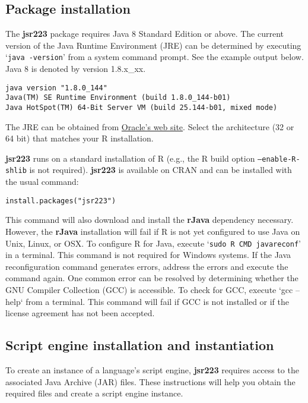 \documentclass[
article,
11pt, %
a4paper, %
oneside, %
headinclude,footinclude, %
]{scrartcl}
\theoremstyle{definition} %
\theoremstyle{plain} %
\theoremstyle{remark} %
\newcommand{\pkg}[1]{\textbf{#1}}
\newcommand{\code}[1]{\texttt{#1}}
\newcommand{\samp}[1]{{`\normalfont\texttt{#1}'}}
\begin{document}
\hypertarget{package-installation}{}
\subsection{Package installation}

The \pkg{jsr223} package requires Java 8 Standard Edition or above. The current version of the Java Runtime Environment (JRE) can be determined by executing \samp{java -version} from a system command prompt. See the example output below. Java 8 is denoted by version 1.8.x\_xx.

\begin{verbatim}
java version "1.8.0_144"
Java(TM) SE Runtime Environment (build 1.8.0_144-b01)
Java HotSpot(TM) 64-Bit Server VM (build 25.144-b01, mixed mode)
\end{verbatim}

The JRE can be obtained from  \href{http://www.oracle.com/technetwork/java/javase/downloads/jre8-downloads-2133155.html}{Oracle's web site}. Select the architecture (32 or 64 bit) that matches your R installation.

\pkg{jsr223} runs on a standard installation of R (e.g., the R build option \code{--enable-R-shlib} is not required). \pkg{jsr223} is available on CRAN and can be installed with the usual command:

\begin{verbatim}
install.packages("jsr223")
\end{verbatim}
This command will also download and install the \pkg{rJava} dependency necessary. However, the \pkg{rJava} installation will fail if R is not yet configured to use Java on Unix, Linux, or OSX. To configure R for Java, execute \samp{sudo R CMD javareconf} in a terminal. This command is not required for Windows systems. If the Java reconfiguration command generates errors, address the errors and execute the command again. One common error can be resolved by determining whether the GNU Compiler Collection (GCC) is accessible. To check for GCC, execute `gcc --help` from a terminal. This command will fail if GCC is not installed or if the license agreement has not been accepted.

\hypertarget{script-engine-installation}{}
\subsection{Script engine installation and instantiation}

To create an instance of a language's script engine, \pkg{jsr223} requires access to the associated Java Archive (JAR) files. These instructions will help you obtain the required files and create a script engine instance.
\end{document}
